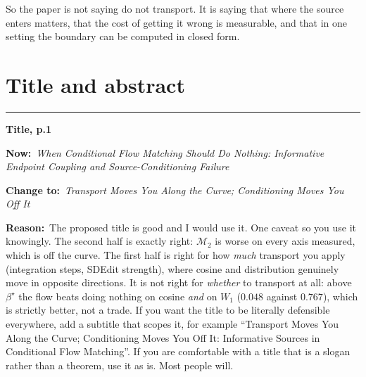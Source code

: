 \documentclass[11pt]{article}
\newcommand{\M}{\mathcal M}
\newcommand{\NEW}[1]{\medskip\noindent\textcolor{hd}{\rule{\textwidth}{0.6pt}}\par
  \noindent\textbf{#1}\par\smallskip}
\newcommand{\OLD}[1]{\noindent\textcolor{cut}{\textbf{Now:}}\ \begingroup\itshape #1\endgroup\par\smallskip}
\newcommand{\FIX}[1]{\noindent\textcolor{put}{\textbf{Change to:}}\ \begingroup\itshape #1\endgroup\par\smallskip}
\newcommand{\NOTE}[1]{\noindent\textbf{Reason:}\ #1\par}
\begin{document}
So the paper is not saying do not transport. It is saying that where the source enters matters,
that the cost of getting it wrong is measurable, and that in one setting the boundary can be
computed in closed form.

\section{Title and abstract}

\NEW{Title, p.1}
\OLD{When Conditional Flow Matching Should Do Nothing: Informative Endpoint Coupling and
Source-Conditioning Failure}
\FIX{Transport Moves You Along the Curve; Conditioning Moves You Off It}
\NOTE{The proposed title is good and I would use it. One caveat so you use it knowingly. The
second half is exactly right: $\M_2$ is worse on every axis measured, which is off the curve. The
first half is right for how \emph{much} transport you apply (integration steps, SDEdit strength),
where cosine and distribution genuinely move in opposite directions. It is not right for
\emph{whether} to transport at all: above $\beta^\star$ the flow beats doing nothing on cosine
\emph{and} on $W_1$ ($0.048$ against $0.767$), which is strictly better, not a trade. If you want
the title to be literally defensible everywhere, add a subtitle that scopes it, for example
``Transport Moves You Along the Curve; Conditioning Moves You Off It: Informative Sources in
Conditional Flow Matching''. If you are comfortable with a title that is a slogan rather than a
theorem, use it as is. Most people will.}
\end{document}
